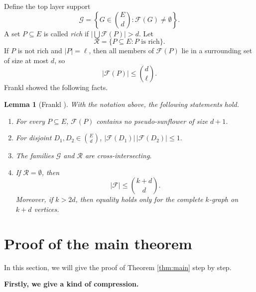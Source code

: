 \documentclass[11pt]{article}
\numberwithin{equation}{section}
\newtheorem{lemma}[theorem]{Lemma}
\begin{document}
	Define the top layer support
	$$
	\mathcal G=
	\left\{G\in\binom{E}{d}:\mathcal F(G)\ne\emptyset\right\}.
	$$
	A set $P\subseteq E$ is called \textit{rich} if
	$
	\left|\bigcup\mathcal F(P)\right|>d.
	$
	Let
$$
	\mathcal R=\{P\subseteq E:P\text{ is rich}\}.
	$$
	If $P$ is not rich and $|P|=\ell$, then all members of $\mathcal F(P)$ lie in a  surrounding set of size at most $d$, so
	\begin{equation}\label{eq:nonrich-bound}
		|\mathcal F(P)|\le \binom{d}{\ell}.
	\end{equation}
	Frankl \cite{FranklCritical} showed the following facts.
	\begin{lemma}[Frankl \cite{FranklCritical}]\label{lem:frankl-facts}
		With the notation above, the following statements hold.
		\begin{enumerate}[(1).]
			\item For every $P\subseteq E$,   $\mathcal F(P)$ contains no pseudo-sunflower of size $d+1$.
			\item For disjoint $D_1,D_2\in\binom{E}{d}$,
			$
			|\mathcal F(D_1)|\,|\mathcal F(D_2)|\le 1.
			$
			\item The families $\mathcal G$ and $\mathcal R$ are cross-intersecting.
			\item If $\mathcal R=\emptyset$, then
			\[
			|\mathcal F|\le \binom{k+d}{d}.
			\]
			Moreover, if $k>2d$, then equality holds only for the complete $k$-graph on $k+d$ vertices.
		\end{enumerate}
	\end{lemma}



	 \section{Proof of the main theorem}\label{sec3}

In this section, we will give  the proof of  Theorem \ref{thm:main} step by step.
\smallskip


	\textbf{Firstly, we give a kind of compression.}


\smallskip
\end{document}
